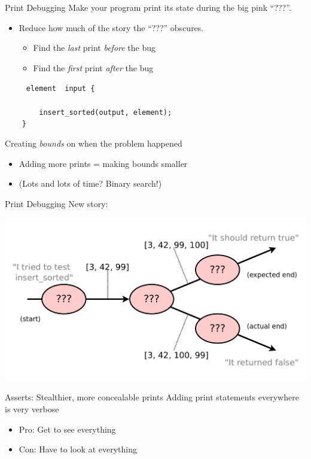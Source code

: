\documentclass[xcolor=dvipsnames]{beamer}
\begin{document}
\begin{frame}{Print Debugging}
	Make your program print its state during the big pink ``???''.
	\begin{itemize}
		\item Reduce how much of the story the ``???'' obscures.
		\begin{itemize}
			\item Find the {\em last} print {\em before} the bug
			\item Find the {\em first} print {\em after} the bug
		\end{itemize}
	\end{itemize}
	\pause

	\linegap
		\texttt{~~~~~element~~input~\{} \\
		\texttt{~~~~~~~~} \\
		\texttt{~~~~~~~~insert\_sorted(output,~element);} \\
		\texttt{~~~~\}} \\
	\pause
	\linegap

	Creating {\em bounds} on when the problem happened
	\begin{itemize}
		\item Adding more prints = making bounds smaller
		\item (Lots and lots of time? Binary search!)
	\end{itemize}
\end{frame}

\begin{frame}{Print Debugging}
	New story:

	\includegraphics[width=\textwidth]{time1.png}
\end{frame}

\begin{frame}{Asserts: Stealthier, more concealable prints}
	Adding print statements everywhere is very verbose
	\begin{itemize}
		\item Pro: Get to see everything
		\item Con: Have to look at everything
	\end{itemize}
	\pause
	\linegap

\end{frame}
\end{document}
